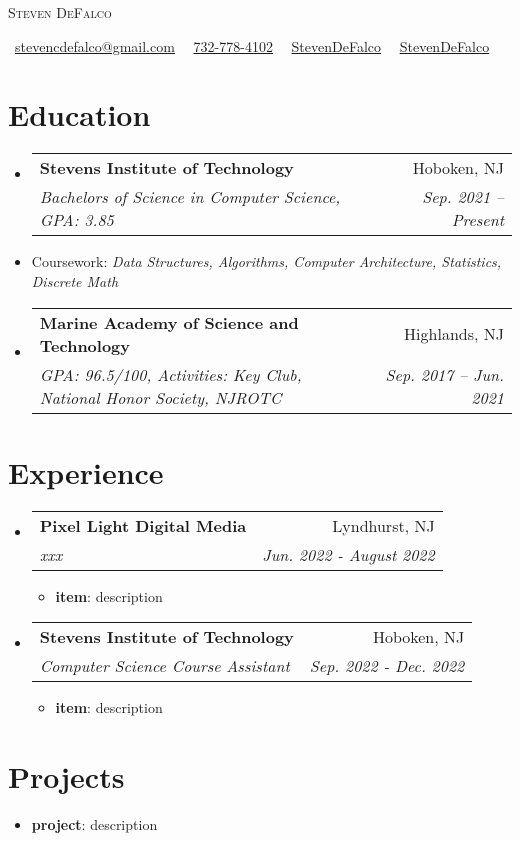 \documentclass[letterpaper,11pt]{article}
\makeatletter
\newcommand{\email}[1]{\faEnvelope\ \href{mailto:#1}{#1}}
\newcommand{\phone}[1]{\faPhone\ \href{tel:#1}{#1}}
\newcommand{\linkedin}[2][]{\faLinkedin\ \href{#2}{#1}}
\newcommand{\github}[2][]{\faGithub\ \href{#2}{#1}}
\newcommand{\name}[1]{ \centerline{\Huge\scshape{#1}} }
\newcommand{\resumeItem}[2]{
  \item\small{
    \textbf{#1}{: #2 \vspace{-2pt}}
  }
}
\newcommand{\resumeSubheading}[4]{
  \vspace{-1pt}\item
    \begin{tabular*}{0.97\textwidth}{l@{\extracolsep{\fill}}r}
      \textbf{#1} & #2 \\
      \textit{\small#3} & \textit{\small #4} \\
    \end{tabular*}\vspace{-5pt}
}
\newcommand{\resumeSubItem}[2]{\resumeItem{#1}{#2}\vspace{-4pt}}
\newcommand{\resumeItemListStart}{\begin{itemize}}
\newcommand{\resumeItemListEnd}{\end{itemize}\vspace{-5pt}}
\makeatother
\begin{document}
\name{Steven DeFalco}
\begin{center}
    \email{stevencdefalco@gmail.com} \textperiodcentered\ 
    \phone{732-778-4102} \textperiodcentered\ 
    \linkedin[StevenDeFalco]{https://www.linkedin.com/in/stevendefalco/} \textperiodcentered\ 
    \github[StevenDeFalco]{https://github.com/StevenDeFalco}    
\end{center}


\section{Education}
  \begin{itemize}[leftmargin=*]
    \resumeSubheading
      {Stevens Institute of Technology}{Hoboken, NJ}
      {Bachelors of Science in Computer Science,  GPA: 3.85}{Sep. 2021 -- Present}
    \item[] \small Coursework: \textit{Data Structures, Algorithms, Computer Architecture, Statistics, Discrete Math}
    \resumeSubheading
      {Marine Academy of Science and Technology}{Highlands, NJ}
      {GPA: 96.5/100, Activities: Key Club, National Honor Society, NJROTC}{Sep. 2017 -- Jun. 2021}
  \end{itemize}


\section{Experience}
  \begin{itemize}[leftmargin=*]

    \resumeSubheading
      {Pixel Light Digital Media}{Lyndhurst, NJ}
      {xxx}{Jun. 2022 - August 2022}
      \resumeItemListStart
        \resumeItem{item}
          {description}
      \resumeItemListEnd

    \resumeSubheading
      {Stevens Institute of Technology}{Hoboken, NJ}
      {Computer Science Course Assistant}{Sep. 2022 - Dec. 2022}
      \resumeItemListStart
        \resumeItem{item}
          {description}
      \resumeItemListEnd
      
  \end{itemize}


\section{Projects}
    \begin{itemize}[leftmargin=*]
        \resumeSubItem{project}
          {description}
    \end{itemize}
\end{document}
